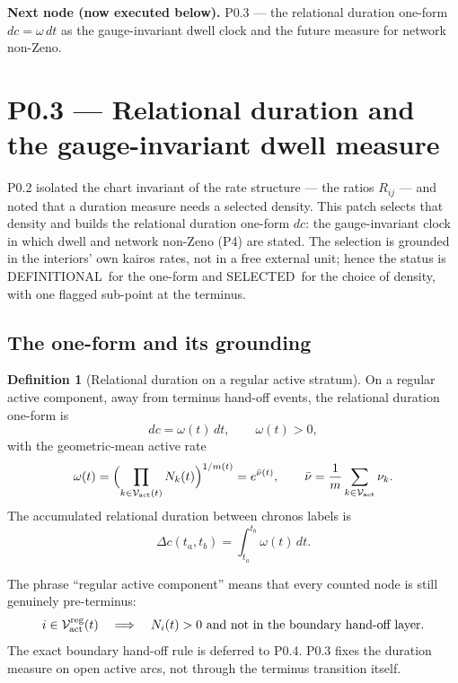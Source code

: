\documentclass[11pt,a4paper]{article}
\def\mathfrak#1{#1}%
\def\emph#1{#1}%
\newcommand{\stDef}{\textcolor{cDef}{\textsf{\small DEFINITIONAL}}}
\newcommand{\stSelected}{\textcolor{cSel}{\textsf{\small SELECTED}}}
\theoremstyle{definition}
\newtheorem{definition}{Definition}[section]
\theoremstyle{plain}
\theoremstyle{remark}
\begin{document}
\medskip
\textbf{Next node (now executed below).} P0.3 --- the relational duration one-form
\(d\mathfrak c=\omega\,dt\) as the gauge-invariant dwell clock and the future measure
for network non-Zeno.

\section{P0.3 --- Relational duration and the gauge-invariant dwell measure}

P0.2 isolated the chart invariant of the rate structure --- the ratios \(R_{ij}\) ---
and noted that a duration measure needs a \emph{selected} density. This patch selects
that density and builds the relational duration one-form \(d\mathfrak c\): the
gauge-invariant clock in which dwell and network non-Zeno (P4) are stated. The
selection is grounded in the interiors' own kairos rates, not in a free external
unit; hence the status is \stDef\ for the one-form and \stSelected\ for the choice of
density, with one flagged sub-point at the terminus.

\subsection{The one-form and its grounding}

\begin{definition}[Relational duration on a regular active stratum]
On a regular active component, away from terminus hand-off events, the relational
duration one-form is
\[
d\mathfrak c=\omega(t)\,dt,\qquad \omega(t)>0,
\]
with the geometric-mean active rate
\[
\omega(t)=\Bigl(\prod_{k\in\mathcal V_{\rm act}(t)}N_k(t)\Bigr)^{1/m(t)}
=e^{\bar\nu(t)},
\qquad
\bar\nu=\frac{1}{m}\sum_{k\in\mathcal V_{\rm act}}\nu_k .
\]
The accumulated relational duration between chronos labels is
\[
\Delta\mathfrak c(t_a,t_b)=\int_{t_a}^{t_b}\omega(t)\,dt .
\]
\end{definition}

The phrase ``regular active component'' means that every counted node is still
genuinely pre-terminus:
\[
i\in\mathcal V_{\rm act}^{\rm reg}(t)
\quad\Longrightarrow\quad
N_i(t)>0
\ \text{and not in the boundary hand-off layer}.
\]
The exact boundary hand-off rule is deferred to P0.4. P0.3 fixes the duration
measure on open active arcs, not through the terminus transition itself.
\end{document}
